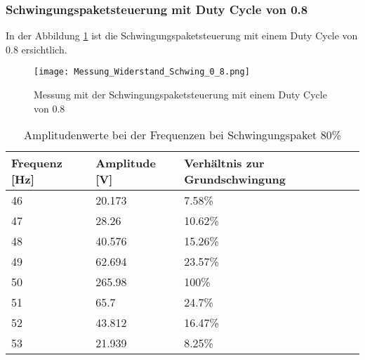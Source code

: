 \newpage
\subsubsection*{Schwingungspaketsteuerung mit Duty Cycle von 0.8}
In der Abbildung \ref{fig:Mess_Schwing_80} ist die Schwingungspaketsteuerung mit einem Duty Cycle von 0.8 ersichtlich.
\begin{figure}[ht!]
	\centering
	\texttt{[image: Messung\_Widerstand\_Schwing\_0\_8.png]}	
	\caption{Messung mit der Schwingungspaketsteuerung mit einem Duty Cycle von 0.8}\label{fig:Mess_Schwing_80}
\end{figure}


\begin{table}[ht!]
	\centering
	\begin{tabular}{|l|l|l|}
		\hline
		Frequenz {[}Hz{]} & Amplitude {[}V{]} & Verhältnis zur Grundschwingung \\ \hline
		46                & 20.173            & 7.58\%                         \\ \hline
		47                & 28.26             & 10.62\%                        \\ \hline
		48                & 40.576            & 15.26\%                        \\ \hline
		49                & 62.694            & 23.57\%                        \\ \hline
		50                & 265.98            & 100\%                          \\ \hline
		51                & 65.7              & 24.7\%                         \\ \hline
		52                & 43.812            & 16.47\%                        \\ \hline
		53                & 21.939            & 8.25\%                         \\ \hline
	\end{tabular}
\caption{Amplitudenwerte bei der Frequenzen bei Schwingungspaket 80\%}\label{tab:Mess_Spannung_Schwing_80}
\end{table}

